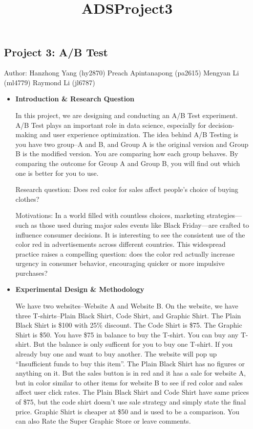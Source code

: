 \documentclass[
  letterpaper,
  DIV=11,
  numbers=noendperiod]{scrartcl}
\title{ADSProject3}
\author{}
\date{}
\begin{document}
\maketitle


\subsection{Project 3: A/B Test}\label{project-3-ab-test}

Author: Hanzhong Yang (hy2870) Preach Apintanapong (pa2615) Mengyan Li
(ml4779) Raymond Li (jl6787)

\begin{itemize}
\item
  \textbf{Introduction \& Research Question}

  In this project, we are designing and conducting an A/B Test
  experiment. A/B Test plays an important role in data science,
  especially for decision-making and user experience optimization. The
  idea behind A/B Testing is you have two group--A and B, and Group A is
  the original version and Group B is the modified version. You are
  comparing how each group behaves. By comparing the outcome for Group A
  and Group B, you will find out which one is better for you to use.

  Research question: Does red color for sales affect people's choice of
  buying clothes?

  Motivations: In a world filled with countless choices, marketing
  strategies---such as those used during major sales events like Black
  Friday---are crafted to influence consumer decisions. It is
  interesting to see the consistent use of the color red in
  advertisements across different countries. This widespread practice
  raises a compelling question: does the color red actually increase
  urgency in consumer behavior, encouraging quicker or more impulsive
  purchases?
\item
  \textbf{Experimental Design \& Methodology}

  We have two websites--Website A and Website B. On the website, we have
  three T-shirts--Plain Black Shirt, Code Shirt, and Graphic Shirt. The
  Plain Black Shirt is \$100 with 25\% discount. The Code Shirt is \$75.
  The Graphic Shirt is \$50. You have \$75 in balance to buy the
  T-shirt. You can buy any T-shirt. But the balance is only sufficent
  for you to buy one T-shirt. If you already buy one and want to buy
  another. The website will pop up ``Insufficient funds to buy this
  item''. The Plain Black Shirt has no figures or anything on it. But
  the sales button is in red and it has a sale for website A, but in
  color similar to other items for website B to see if red color and
  sales affect user click rates. The Plain Black Shirt and Code Shirt
  have same prices of \$75, but the code shirt doesn't use sale strategy
  and simply state the final price. Graphic Shirt is cheaper at \$50 and
  is used to be a comparison. You can also Rate the Super Graphic Store
  or leave comments.


\end{itemize}
\end{document}
